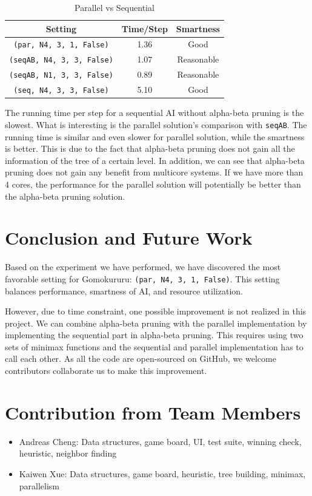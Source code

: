 \documentclass[twoside,11pt]{homework}
\begin{document}
\begin{table}[h!]
\centering
\begin{tabular}{||c c c||} 
 \hline
 Setting & Time/Step & Smartness \\ [0.5ex] 
 \hline\hline
 \texttt{(par, N4, 3, 1, False)} & 1.36 & Good \\
 \texttt{(seqAB, N4, 3, 3, False)} & 1.07 & Reasonable \\
 \texttt{(seqAB, N1, 3, 3, False)} & 0.89 & Reasonable \\
 \texttt{(seq, N4, 3, 3, False)} & 5.10 & Good \\ [1ex] 
 \hline
\end{tabular}
\caption{Parallel vs Sequential}
\label{parallel-vs-sequential}
\end{table}

The running time per step for a sequential AI without alpha-beta pruning is the slowest. What is interesting is the parallel solution's comparison with \texttt{seqAB}. The running time is similar and even slower for parallel solution, while the smartness is better. This is due to the fact that alpha-beta pruning does not gain all the information of the tree of a certain level. In addition, we can see that alpha-beta pruning does not gain any benefit from multicore systems. If we have more than 4 cores, the performance for the parallel solution will potentially be better than the alpha-beta pruning solution.

\section{Conclusion and Future Work} \label{experiment}
Based on the experiment we have performed, we have discovered the most favorable setting for Gomokururu: \texttt{(par, N4, 3, 1, False)}. This setting balances performance, smartness of AI, and resource utilization.

However, due to time constraint, one possible improvement is not realized in this project. We can combine alpha-beta pruning with the parallel implementation by implementing the sequential part in alpha-beta pruning. This requires using two sets of minimax functions and the sequential and parallel implementation has to call each other. As all the code are open-sourced on GitHub, we welcome contributors collaborate us to make this improvement.

\section{Contribution from Team Members}
\begin{itemize}
  \item Andreas Cheng: Data structures, game board, UI, test suite, winning check, heuristic, neighbor finding
  \item Kaiwen Xue: Data structures, game board, heuristic, tree building, minimax, parallelism
\end{itemize}
\newpage
\end{document}

